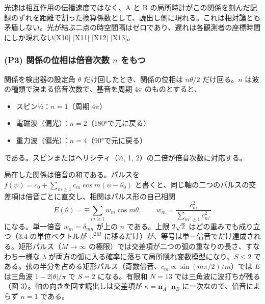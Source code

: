\documentclass[
  a4paper,
]{ltjsarticle}
\providecommand{\tightlist}{%
  \setlength{\itemsep}{0pt}\setlength{\parskip}{0pt}}
\begin{document}
光速は相互作用の伝播速度ではなく、A と B
の局所時計がこの関係を刻んだ記録のずれを距離で割った換算係数として、読出し側に現れる。これは相対論とも矛盾しない。光が結ぶ二点の時空間隔はゼロであり、遅れは各観測者の座標時間にしか現れない{[}X10{]}
{[}X11{]} {[}X12{]} {[}X13{]}。

\subsubsection{\texorpdfstring{(P3) 関係の位相は倍音次数 \(n\)
をもつ}{(P3) 関係の位相は倍音次数 n をもつ}}\label{p3-ux95a2ux4fc2ux306eux4f4dux76f8ux306fux500dux97f3ux6b21ux6570-n-ux3092ux3082ux3064}

関係を検出器の設定角 \(\theta\) だけ回したとき、関係の位相は
\(n\theta/2\) だけ回る。\(n\) は波の種類で決まる倍音次数で、基音を周期
\(4\pi\) のものとすると、

\begin{itemize}
\tightlist
\item
  スピン½：\(n=1\)（周期 \(4\pi\)）
\item
  電磁波（偏光）：\(n=2\)（180°で元に戻る）
\item
  重力波（偏光）：\(n=4\)（90°で元に戻る）
\end{itemize}

である。スピンまたはヘリシティ（½, 1, 2）の二倍が倍音次数に対応する。

局在した関係は倍音の和である。パルスを
\(f(\psi)=c_0+\sum_{m\ge1}c_m\cos m(\psi-\theta_0)\)
と書くと、同じ軸の二つのパルスの交差項は倍音ごとに直交し、相関はパルス形の自己相関
\[E(\theta)=\mp\sum_{m\ge1}w_m\cos m\theta,\qquad w_m=\frac{c_m^{2}}{\sum_{m'\ge1}c_{m'}^{2}}\]
になる。単一倍音 \(w_m=\delta_{mn}\) が上の \(n\) である。上限
\(2\sqrt{2}\) はどの重みでも成り立つ（3.4 の単位ベクトルが
\(\mathbb{R}^{2M}\)
に移るだけ）が、等号は単一倍音でだけ達成される。矩形パルス（\(M\to\infty\)
の極限）では交差項が二つの弧の重なりの長さ、すなわち一様な \(\lambda\)
が両方の弧に入る確率に落ちて局所隠れ変数模型になり、\(S\le2\)
である。弦の半分を占める矩形パルス（奇数倍音、\(c_m\propto\sin(m\pi/2)/m\)）では
\(E\) は三角波 \(1-2|\theta|/\pi\) で \(S=2\) になる。有限和 \(N=13\)
では三角波に波打ちが残る（図 3）。軸の向きを回す読出しは交差項が
\(\kappa=\boldsymbol{n}_A\cdot\boldsymbol{n}_B\)
に一次なので、倍音によらず \(n=1\) である。
\end{document}
